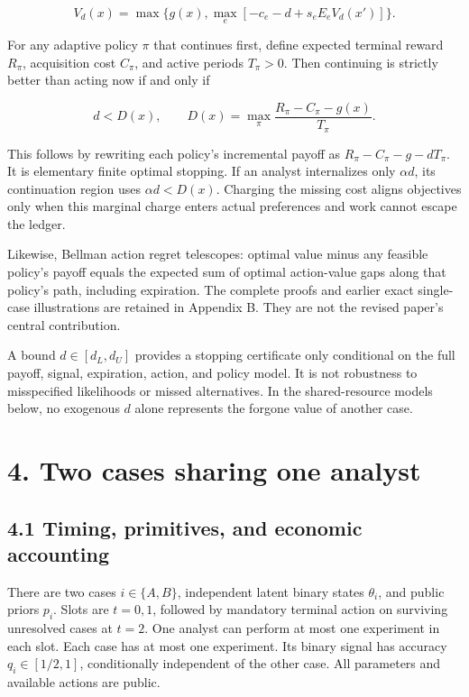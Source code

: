 \documentclass[
  11pt,
]{article}
\begin{document}
\[V_d(x)=\max\{g(x),\max_e[-c_e-d+s_eE_eV_d(x')]\}.\]

For any adaptive policy \(\pi\) that continues first, define expected
terminal reward \(R_\pi\), acquisition cost \(C_\pi\), and active
periods \(T_\pi>0\). Then continuing is strictly better than acting now
if and only if

\[d<D(x),\qquad D(x)=\max_\pi\frac{R_\pi-C_\pi-g(x)}{T_\pi}.\]

This follows by rewriting each policy's incremental payoff as
\(R_\pi-C_\pi-g-dT_\pi\). It is elementary finite optimal stopping. If
an analyst internalizes only \(\alpha d\), its continuation region uses
\(\alpha d<D(x)\). Charging the missing cost aligns objectives only when
this marginal charge enters actual preferences and work cannot escape
the ledger.

Likewise, Bellman action regret telescopes: optimal value minus any
feasible policy's payoff equals the expected sum of optimal action-value
gaps along that policy's path, including expiration. The complete proofs
and earlier exact single-case illustrations are retained in Appendix B.
They are not the revised paper's central contribution.

A bound \(d\in[d_L,d_U]\) provides a stopping certificate only
conditional on the full payoff, signal, expiration, action, and policy
model. It is not robustness to misspecified likelihoods or missed
alternatives. In the shared-resource models below, no exogenous \(d\)
alone represents the forgone value of another case.

\section{4. Two cases sharing one
analyst}\label{two-cases-sharing-one-analyst}

\subsection{4.1 Timing, primitives, and economic
accounting}\label{timing-primitives-and-economic-accounting}

There are two cases \(i\in\{A,B\}\), independent latent binary states
\(\theta_i\), and public priors \(p_i\). Slots are \(t=0,1\), followed
by mandatory terminal action on surviving unresolved cases at \(t=2\).
One analyst can perform at most one experiment in each slot. Each case
has at most one experiment. Its binary signal has accuracy
\(q_i\in[1/2,1]\), conditionally independent of the other case. All
parameters and available actions are public.
\end{document}
